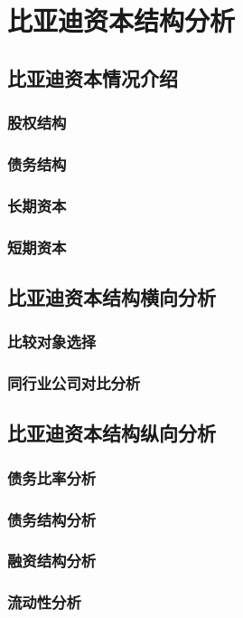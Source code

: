 \chapter{比亚迪资本结构分析}
\section{比亚迪资本情况介绍}
\subsection{股权结构}
\subsection{债务结构}
\subsection{长期资本}
\subsection{短期资本}
\section{比亚迪资本结构横向分析}
\subsection{比较对象选择}
\subsection{同行业公司对比分析}
\section{比亚迪资本结构纵向分析}
\subsection{债务比率分析}
\subsection{债务结构分析}
\subsection{融资结构分析}
\subsection{流动性分析}
